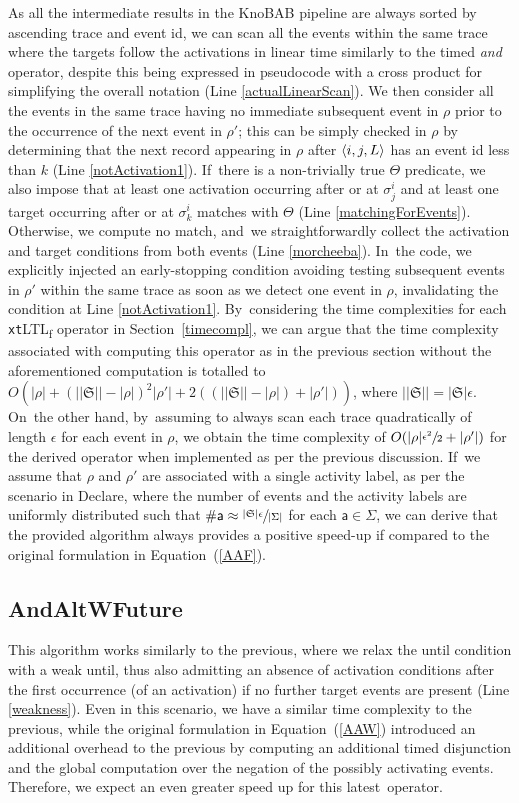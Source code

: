\documentclass[information,article,accept,pdftex,oneauthor]{Definitions/mdpi}
\newcommand{\LOG}{\ensuremath{\mathfrak{S}}}
\begin{document}
As all the intermediate results in the KnoBAB pipeline are always sorted by ascending trace and event id, we can scan all the events within the same trace where the targets follow the activations in linear time similarly to the timed \textit{and} operator, despite this being expressed in pseudocode with a cross product for simplifying the overall notation ({Line} %
 \ref{actualLinearScan}). We then consider all the events in the same trace having no immediate subsequent event in $\rho$ prior to the occurrence of the next event in $\rho'$; this can be simply checked in $\rho$ by determining that the next record appearing in $\rho$ after $\braket{i,j,L}$ has an event id less than $k$ ({Line} \ref{notActivation1}). If~there is a non-trivially true $\Theta$ predicate, we also impose that at least one activation occurring after or at $\sigma^i_j$ and at least one target occurring after or at $\sigma^i_k$ matches with $\Theta$ ({Line} \ref{matchingForEvents}). Otherwise, we compute no match, and~we straightforwardly collect the activation and target conditions from both events ({Line} \ref{morcheeba}). In~the code, we explicitly injected an early-stopping condition avoiding testing subsequent events in $\rho'$ within the same trace as soon as we detect one event in $\rho$, invalidating the condition at {Line} \ref{notActivation1}. By~considering the time complexities for each \texttt{xt}LTL\textsubscript{f} operator in Section~\ref{timecompl}, we can argue that the time complexity associated with computing this operator as in the previous section without the aforementioned computation is totalled to $O(|\rho|+(||\LOG||-|\rho|)^2|\rho'|+2((||\LOG||-|\rho|)+|\rho'|))$, where $||\LOG||=|\LOG|\epsilon$. On~the other hand, by~assuming to always scan each trace quadratically of length $\epsilon$ for each event in $\rho$, we obtain the time complexity of $O(|\rho|\sfrac{\epsilon^2}{2}+|\rho'|)$ for the derived operator when implemented as per the previous discussion. If~we assume that $\rho$ and $\rho'$ are associated with a single activity label, as per the scenario in Declare, where the number of events and the activity labels are uniformly distributed such that $\# \textsf{a}\approx \sfrac{|\LOG|\epsilon}{|\Sigma|}$ for each $\textsf{a}\in\Sigma$, we can derive that the provided algorithm always provides a positive speed-up if compared to the original formulation in Equation~(\ref{AAF}). 

\subsection{AndAltWFuture} 
This algorithm works similarly to the previous, where we relax the until condition with a weak until, thus also admitting an absence of activation conditions after the first occurrence (of an activation) if no further target events are present ({Line} \ref{weakness}). Even in this scenario, we have a similar time complexity to the previous, while the original formulation in Equation~(\ref{AAW}) introduced an additional overhead to the previous by computing an additional timed disjunction and the global computation over the negation of the possibly activating events. Therefore, we expect an even greater speed up for this latest~operator.   
\end{document}
